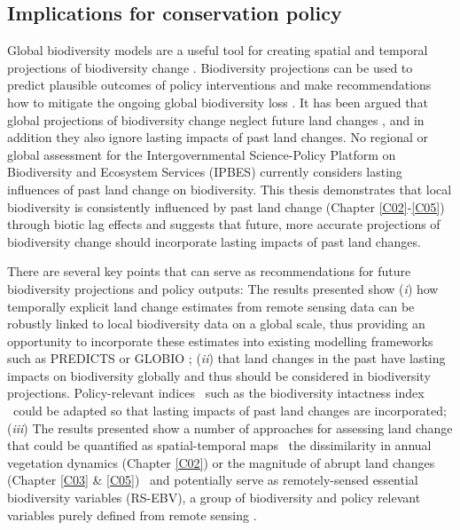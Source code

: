 \subsection{Implications for conservation policy}
\label{C06_0202}

Global biodiversity models are a useful tool for creating spatial and temporal projections of biodiversity change \citep{Pereira2010,Harfoot2014,Purvis2018}. Biodiversity projections can be used to predict plausible outcomes of policy interventions and make recommendations how to mitigate the ongoing global biodiversity loss \citep{Mace2018}. It has been argued that global projections of biodiversity change neglect future land changes \citep{Titeux2016}, and in addition they also ignore lasting impacts of past land changes. No regional or global assessment for the Intergovernmental Science-Policy Platform on Biodiversity and Ecosystem Services (IPBES) currently considers lasting influences of past land change on biodiversity. This thesis demonstrates that local biodiversity is consistently influenced by past land change (Chapter \ref{C02}-\ref{C05}) through biotic lag effects and suggests that future, more accurate projections of biodiversity change should incorporate lasting impacts of past land changes. 

There are several key points that can serve as recommendations for future biodiversity projections and policy outputs: The results presented show (\textit{i}) how temporally explicit land change estimates from remote sensing data can be robustly linked to local biodiversity data on a global scale, thus providing an opportunity to incorporate these estimates into existing modelling frameworks such as PREDICTS \citep{Newbold2015,Newbold2016a,Purvis2018} or GLOBIO \citep{Alkemade2009}; (\textit{ii}) that land changes in the past have lasting impacts on biodiversity globally and thus should be considered in biodiversity projections. Policy-relevant indices \textendash\ such as the biodiversity intactness index \citep{Newbold2016a,Purvis2018} \textendash\ could be adapted so that lasting impacts of past land changes are incorporated; (\textit{iii}) The results presented show a number of approaches for assessing land change that could be quantified as spatial-temporal maps \textendash\ \ie the dissimilarity in annual vegetation dynamics (Chapter \ref{C02}) or the magnitude of abrupt land changes (Chapter \ref{C03} \& \ref{C05}) \textendash\ and potentially serve as remotely-sensed essential biodiversity variables (RS-EBV), a group of biodiversity and policy relevant variables purely defined from remote sensing \citep{Skidmore2015,Lausch2016}.

